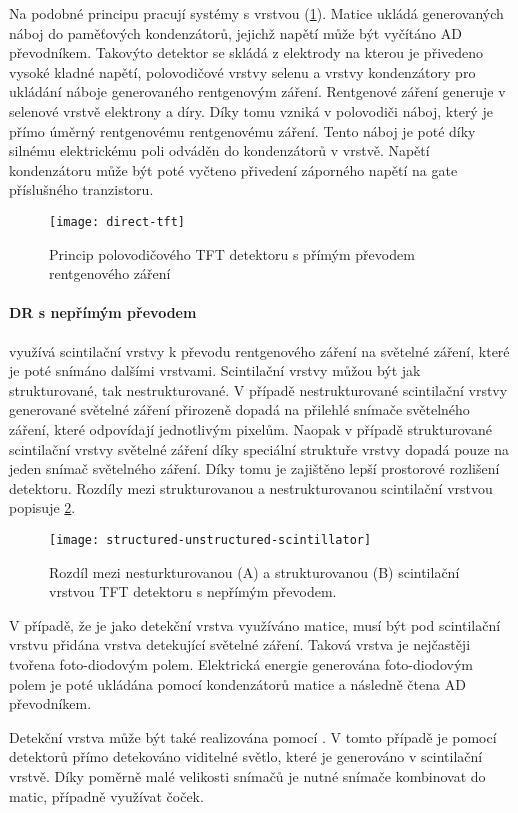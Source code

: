 Na podobné principu pracují systémy s vrstvou  (\cref{fig:direct-tft}). Matice  ukládá generovaných náboj do paměťových kondenzátorů, jejichž napětí může být vyčítáno AD převodníkem. Takovýto detektor se skládá z elektrody na kterou je přivedeno vysoké kladné napětí, polovodičové vrstvy selenu a vrstvy  kondenzátory pro ukládání náboje generovaného rentgenovým záření. Rentgenové záření generuje v selenové vrstvě elektrony a díry. Díky tomu vzniká v polovodiči náboj, který je přímo úměrný rentgenovému rentgenovému záření. Tento náboj je poté díky silnému elektrickému poli odváděn do kondenzátorů v  vrstvě. Napětí kondenzátoru může být poté vyčteno přivedení záporného napětí na gate příslušného tranzistoru.

\begin{figure}[ht]
\centering
\texttt{[image: direct-tft]}
\caption{Princip polovodičového TFT detektoru s přímým převodem rentgenového záření \cite[str.~511]{Radiation-Detection-and-Measurement}}
\label{fig:direct-tft}
\end{figure}

\paragraph{DR s nepřímým převodem}
využívá scintilační vrstvy k převodu rentgenového záření na světelné záření, které je poté snímáno dalšími vrstvami. Scintilační vrstvy můžou být jak strukturované, tak nestrukturované. V případě nestrukturované scintilační vrstvy generované světelné záření přirozeně dopadá na přilehlé snímače světelného záření, které odpovídají jednotlivým pixelům. Naopak v případě strukturované scintilační vrstvy světelné záření díky speciální struktuře vrstvy dopadá pouze na jeden snímač světelného záření. Díky tomu je zajištěno lepší prostorové rozlišení detektoru. Rozdíly mezi strukturovanou a nestrukturovanou scintilační vrstvou popisuje \cref{fig:structured-unstructured-scintillator}.

\begin{figure}[ht]
\centering
\texttt{[image: structured-unstructured-scintillator]}
\caption{Rozdíl mezi nesturkturovanou (A) a strukturovanou (B) scintilační vrstvou TFT detektoru s nepřímým převodem. \cite[str~210]{Diagnostic-Radiology}}
\label{fig:structured-unstructured-scintillator}
\end{figure}

V případě, že je jako detekční vrstva využíváno  matice, musí být pod scintilační vrstvu přidána vrstva detekující světelné záření. Taková vrstva je nejčastěji tvořena foto-diodovým polem. Elektrická energie generována foto-diodovým polem je poté ukládána pomocí kondenzátorů  matice a následně  čtena AD převodníkem.

Detekční vrstva může být také realizována pomocí . V tomto případě je pomocí  detektorů přímo detekováno viditelné světlo, které je generováno v scintilační vrstvě. Díky poměrně malé velikosti  snímačů je nutné snímače kombinovat do matic, případně využívat čoček.
